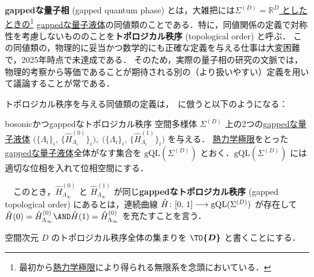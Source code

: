 \documentclass[TQFT_main]{subfiles}
\begin{document}

\textbf{gappedな量子相} (gapped quantum phase) とは，大雑把には\underline{$\Sigma^{(D)} = \mathbb{R}^{D}$ としたときの}\footnote{最初から\hyperref[def:bosonic-lattice-model]{熱力学極限}により得られる無限系を念頭においている．} \hyperref[def:gappedQL]{gappedな量子液体}の同値類のことである．特に，同値関係の定義で対称性を考慮しないもののことを\textbf{トポロジカル秩序} (topological order) と呼ぶ．
この同値類の，物理的に妥当かつ数学的にも正確な定義を与える仕事は大変困難で，2025年時点で未達成である．
そのため，実際の量子相の研究の文脈では，物理的考察から等価であることが期待される別の（より扱いやすい）定義を用いて議論することが常である．

トポロジカル秩序を与える同値類の定義は，~\cite[p.3]{ChenGuWen2010}に倣うと以下のようになる：

\begin{mydefph}[label=def:quantum-phase,breakable]{bosonicかつgappedなトポロジカル秩序}
    空間多様体 $\Sigma^{(D)}$ 上の2つの\hyperref[def:gappedQL]{gappedな量子液体} $\bigl( \{\Lambda_i\}_i,\, \{\hat{H}^{(0)}_{\Lambda_i}\}_i \bigr),\; \bigl( \{\Lambda_i\}_i,\, \{\hat{H}^{(1)}_{\Lambda_i}\}_i \bigr)$ を与える．
    \hyperref[def:bosonic-lattice-model]{熱力学極限}をとった\hyperref[def:gappedQL]{gappedな量子液体}全体がなす集合を $\mathrm{gQL}(\Sigma^{(D)})$ とおく．$\mathrm{gQL}(\Sigma^{(D)})$ には適切な位相を入れて位相空間にする．

    　このとき，$\hat{H}^{(0)}_{\Lambda_\infty}$ と $\hat{H}^{(1)}_{\Lambda_\infty}$ が同じ\textbf{gappedなトポロジカル秩序} (gapped topological order) にあるとは，連続曲線 $\hat{H} \colon [0,\, 1] \longrightarrow \mathrm{gQL}(\Sigma^{(D)})$ が存在して
    $\hat{H}(0) = \hat{H}^{(0)}_{\Lambda_\infty} \AND \hat{H}(1) = \hat{H}^{(0)}_{\Lambda_\infty}$ を充たすことを言う．

    \tcblower

    空間次元 $D$ のトポロジカル秩序全体の集まりを $\bm{\TO{D}}$ と書くことにする．
\end{mydefph}
\end{document}
